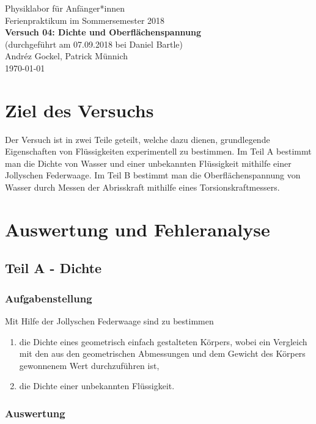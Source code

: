 \documentclass[11pt,a4paper]{article}
\begin{document}
{
\centering 
\large 
Physiklabor für Anf\"anger*innen \\
Ferienpraktikum im Sommersemester 2018 \\[4mm]
\textbf{\LARGE 
Versuch 04: Dichte und Oberflächenspannung
} \\[3mm]
(durchgef\"uhrt am 07.09.2018 bei Daniel Bartle) \\
Andréz Gockel, Patrick M\"unnich\\
\today \\[10mm]
}

\section{Ziel des Versuchs}

Der Versuch ist in zwei Teile geteilt, welche dazu dienen, grundlegende Eigenschaften von Fl\"ussigkeiten experimentell zu bestimmen. Im Teil A bestimmt man die Dichte von Wasser und einer unbekannten Fl\"ussigkeit mithilfe einer Jollyschen Federwaage. Im Teil B bestimmt man die Oberfl\"achen\-spannung von Wasser durch Messen der Abrisskraft mithilfe eines Torsionskraftmessers.


\section{Auswertung und Fehleranalyse}


\subsection{Teil A - Dichte}

\subsubsection{Aufgabenstellung}
Mit Hilfe der Jollyschen Federwaage sind zu bestimmen
\begin{enumerate}
\item{die Dichte eines geometrisch einfach gestalteten K\"orpers, wobei ein Vergleich mit den aus den
geometrischen Abmessungen und dem Gewicht des K\"orpers gewonnenem Wert durchzuf\"uhren
ist,}
\item{die Dichte einer unbekannten Fl\"ussigkeit.}
\end{enumerate}

\subsubsection{Auswertung}
\end{document}
